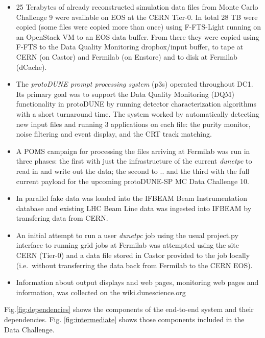 \documentclass[pdftex,12pt,letter]{article}
\newcommand{\pd}{protoDUNE\xspace}
\newcommand{\dtpc}{\textit{dunetpc}\xspace}
\begin{document}
\begin{itemize}

\item 25 Terabytes of already reconstructed simulation data files from Monte Carlo Challenge 9 were available on EOS at the CERN Tier-0.
In total 28 TB  were copied (some files were copied more than once) using F-FTS-Light running on an OpenStack VM to an EOS data buffer.
From there they were copied using F-FTS to the Data Quality Monitoring dropbox/input buffer, to tape at CERN (on Castor) and Fermilab
(on Enstore) and to disk at Fermilab (dCache). 

\item   The \textit{protoDUNE prompt processing system} (p3s) operated throughout DC1. Its primary goal was to support
the Data Quality Monitoring (DQM)  functionality in \pd by running detector characterization algorithms with a short turnaround time.
The system worked by automatically detecting new input files and running 3 applications on each file: the purity monitor,
noise filtering and event display, and the CRT track matching. 

\item A POMS campaign for processing the files arriving at Fermilab was run in three phases: the first with just the infrastructure
of the current \dtpc to read in and write out the data; the second to .. and the third with the full current payload for the
upcoming protoDUNE-SP MC Data Challenge 10. 

\item In parallel fake data was loaded into the IFBEAM Beam Instrumentation database and existing LHC Beam Line data was ingested into IFBEAM by transfering data from CERN.

\item An initial attempt to run a user \dtpc job using the  usual project.py interface to running grid jobs at Fermilab was
attempted using the site CERN (Tier-0) and a data file stored in Castor provided to the job locally (i.e.~without transferring
the data back from Fermilab to the CERN EOS). 

\item Information about output displays and web pages, monitoring web pages and information, was collected on the wiki.dunescience.org

\end{itemize}

 Fig.\ref{fig:dependencies} shows the components of the end-to-end system and their dependencies. Fig. \ref{fig:intermediate} shows those components included in the Data Challenge. 
\end{document}
